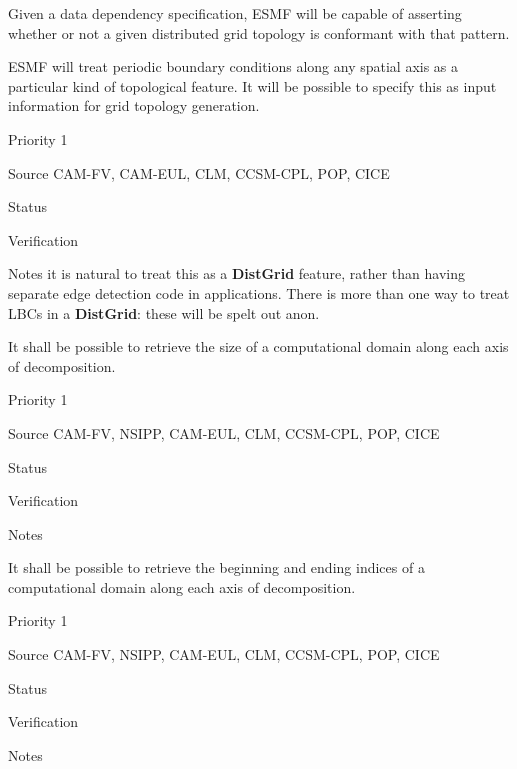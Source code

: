 
Given a data dependency specification, ESMF will be capable of
asserting whether or not a given distributed grid topology is
conformant with that pattern.


ESMF will treat periodic boundary conditions along any spatial axis as
a particular kind of topological feature. It will be possible to
specify this as input information for grid topology generation.

\begin{reqlist}
\item[Priority] 1
\item[Source] CAM-FV, CAM-EUL, CLM, CCSM-CPL, POP, CICE
\item[Status]
\item[Verification]
\item[Notes] it is natural to treat this as a \textbf{DistGrid}
  feature, rather than having separate edge detection code in
  applications. There is more than one way to treat LBCs in a
  \textbf{DistGrid}: these will be spelt out anon.
\end{reqlist}




It shall be possible to retrieve the size of a computational domain
along each axis of decomposition.

\begin{reqlist}
\item[Priority] 1
\item[Source] CAM-FV, NSIPP, CAM-EUL, CLM, CCSM-CPL, POP, CICE
\item[Status]
\item[Verification]
\item[Notes]
\end{reqlist}


It shall be possible to retrieve the beginning and ending indices of a
computational domain along each axis of decomposition.

\begin{reqlist}
\item[Priority] 1
\item[Source] CAM-FV, NSIPP, CAM-EUL, CLM, CCSM-CPL, POP, CICE
\item[Status]
\item[Verification]
\item[Notes]
\end{reqlist}

